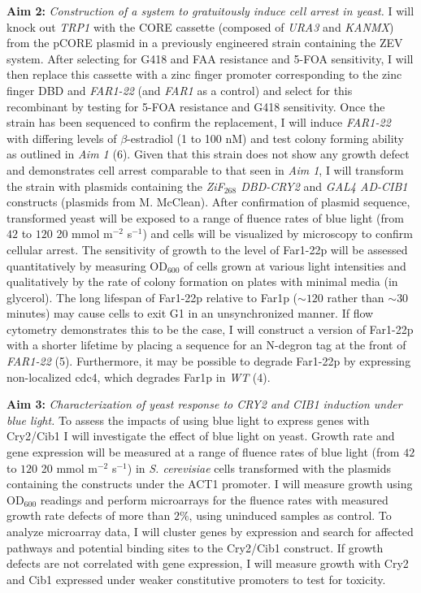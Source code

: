 \documentclass[12pt]{article}
\begin{document}
\textbf{Aim 2:} \emph{Construction of a system to gratuitously induce cell arrest in yeast.}
I will knock out \emph{TRP1} with the CORE cassette (composed of \emph{URA3} and \emph{KANMX}) from the pCORE plasmid in a previously engineered strain containing the ZEV system. After selecting for G418 and FAA resistance and 5-FOA sensitivity, I  will then replace this cassette with a zinc finger promoter corresponding to the zinc finger DBD and \emph{FAR1-22} (and \emph{FAR1} as a control) and select for this recombinant by testing for 5-FOA resistance and G418 sensitivity. 
%
Once the strain has been sequenced to confirm the replacement, I will induce \emph{FAR1-22} with differing levels of $\beta$-estradiol (1 to 100 nM) and test colony forming ability as outlined in \emph{Aim 1} (6). Given that this strain does not show any growth defect and demonstrates cell arrest comparable to that seen in \emph{Aim 1}, I will transform the strain with plasmids containing the \emph{ZiF$_{268}$ DBD-CRY2} and \emph{GAL4 AD-CIB1} constructs (plasmids from M. McClean).
%
After confirmation of plasmid sequence, transformed yeast will be exposed to a range of fluence rates of blue light (from $42$ to $120$ 20 mmol m$^{−2}$ s$^{−1}$) and cells will be visualized by microscopy to confirm cellular arrest. The sensitivity of growth to the level of Far1-22p will be assessed quantitatively by measuring OD$_{600}$ of cells grown at various light intensities and qualitatively by the rate of colony formation on plates with minimal media (in glycerol). 
% 
The long lifespan of Far1-22p relative to Far1p ($\sim 120$ rather than $\sim 30$ minutes) may cause cells to exit G1 in an unsynchronized manner. If flow cytometry demonstrates this to be the case, I will construct a version of Far1-22p with a shorter lifetime by placing a sequence for an N-degron tag at the front of \emph{FAR1-22} (5). Furthermore, it may be possible to degrade Far1-22p by expressing non-localized cdc4, which degrades Far1p in \emph{WT} (4).

\textbf{Aim 3:} \emph{Characterization of yeast response to CRY2 and CIB1 induction under blue light.}
To assess the impacts of using blue light to express genes with Cry2/Cib1 I will investigate the effect of blue light on yeast. Growth rate and gene expression will be measured at a range of fluence rates of blue light (from $42$ to $120$ 20 mmol m$^{−2}$ s$^{−1}$) in \emph{S. cerevisiae} cells transformed with the plasmids containing the constructs under the ACT1 promoter. I will measure growth using OD$_{600}$ readings and perform microarrays for the fluence rates with measured growth rate defects of more than $2\%$, using uninduced samples as control. To analyze microarray data, I will cluster genes by expression and search for affected pathways and potential binding sites to the Cry2/Cib1 construct. If growth defects are not correlated with gene expression, I will measure growth with Cry2 and Cib1 expressed under weaker constitutive promoters to test for toxicity. 
\end{document}
